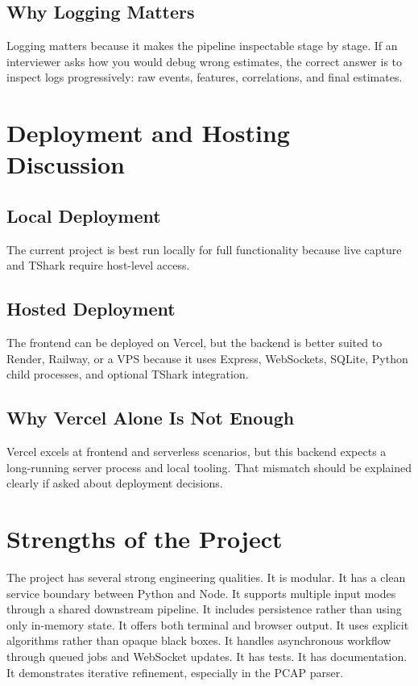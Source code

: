 \documentclass[12pt,a4paper]{report}
\begin{document}
\section{Why Logging Matters}
Logging matters because it makes the pipeline inspectable stage by stage. If an interviewer asks how you would debug wrong estimates, the correct answer is to inspect logs progressively: raw events, features, correlations, and final estimates.

\chapter{Deployment and Hosting Discussion}
\section{Local Deployment}
The current project is best run locally for full functionality because live capture and TShark require host-level access.

\section{Hosted Deployment}
The frontend can be deployed on Vercel, but the backend is better suited to Render, Railway, or a VPS because it uses Express, WebSockets, SQLite, Python child processes, and optional TShark integration.

\section{Why Vercel Alone Is Not Enough}
Vercel excels at frontend and serverless scenarios, but this backend expects a long-running server process and local tooling. That mismatch should be explained clearly if asked about deployment decisions.

\chapter{Strengths of the Project}
The project has several strong engineering qualities. It is modular. It has a clean service boundary between Python and Node. It supports multiple input modes through a shared downstream pipeline. It includes persistence rather than using only in-memory state. It offers both terminal and browser output. It uses explicit algorithms rather than opaque black boxes. It handles asynchronous workflow through queued jobs and WebSocket updates. It has tests. It has documentation. It demonstrates iterative refinement, especially in the PCAP parser.
\end{document}
